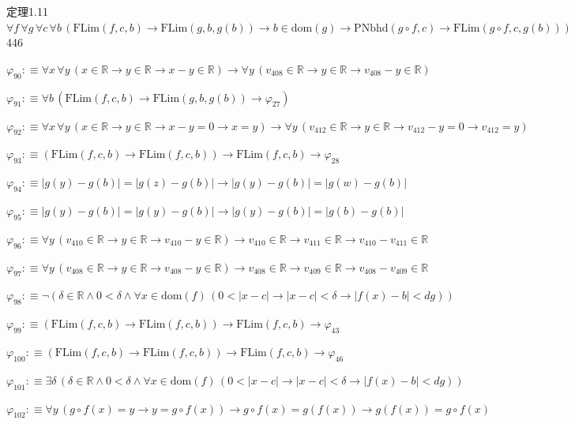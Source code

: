 \begin{fullproof}{定理1.11}{$\forall f\,\forall g\,\forall c\,\forall b\,(\mathrm{FLim}(f,c,b) \to \mathrm{FLim}(g,b,g(b)) \to b \in \mathrm{dom}(g) \to \mathrm{PNbhd}(g \circ f,c) \to \mathrm{FLim}(g \circ f,c,g(b)))$}{446}
\begin{abbrevlist}
\item $\varphi_{90} :\equiv \forall x\,\forall y\,(x \in \mathbb{R} \to y \in \mathbb{R} \to x - y \in \mathbb{R}) \to \forall y\,(v_{408} \in \mathbb{R} \to y \in \mathbb{R} \to v_{408} - y \in \mathbb{R})$
\item $\varphi_{91} :\equiv \forall b\,(\mathrm{FLim}(f,c,b) \to \mathrm{FLim}(g,b,g(b)) \to \varphi_{27})$
\item $\varphi_{92} :\equiv \forall x\,\forall y\,(x \in \mathbb{R} \to y \in \mathbb{R} \to x - y = 0 \to x = y) \to \forall y\,(v_{412} \in \mathbb{R} \to y \in \mathbb{R} \to v_{412} - y = 0 \to v_{412} = y)$
\item $\varphi_{93} :\equiv (\mathrm{FLim}(f,c,b) \to \mathrm{FLim}(f,c,b)) \to \mathrm{FLim}(f,c,b) \to \varphi_{28}$
\item $\varphi_{94} :\equiv \lvert g(y) - g(b) \rvert = \lvert g(z) - g(b) \rvert \to \lvert g(y) - g(b) \rvert = \lvert g(w) - g(b) \rvert$
\item $\varphi_{95} :\equiv \lvert g(y) - g(b) \rvert = \lvert g(y) - g(b) \rvert \to \lvert g(y) - g(b) \rvert = \lvert g(b) - g(b) \rvert$
\item $\varphi_{96} :\equiv \forall y\,(v_{410} \in \mathbb{R} \to y \in \mathbb{R} \to v_{410} - y \in \mathbb{R}) \to v_{410} \in \mathbb{R} \to v_{411} \in \mathbb{R} \to v_{410} - v_{411} \in \mathbb{R}$
\item $\varphi_{97} :\equiv \forall y\,(v_{408} \in \mathbb{R} \to y \in \mathbb{R} \to v_{408} - y \in \mathbb{R}) \to v_{408} \in \mathbb{R} \to v_{409} \in \mathbb{R} \to v_{408} - v_{409} \in \mathbb{R}$
\item $\varphi_{98} :\equiv \neg (\delta \in \mathbb{R} \land 0 < \delta \land \forall x \in \mathrm{dom}(f)\,(0 < \lvert x - c \rvert \to \lvert x - c \rvert < \delta \to \lvert f(x) - b \rvert < \mathit{dg}))$
\item $\varphi_{99} :\equiv (\mathrm{FLim}(f,c,b) \to \mathrm{FLim}(f,c,b)) \to \mathrm{FLim}(f,c,b) \to \varphi_{43}$
\item $\varphi_{100} :\equiv (\mathrm{FLim}(f,c,b) \to \mathrm{FLim}(f,c,b)) \to \mathrm{FLim}(f,c,b) \to \varphi_{46}$
\item $\varphi_{101} :\equiv \exists \delta\,(\delta \in \mathbb{R} \land 0 < \delta \land \forall x \in \mathrm{dom}(f)\,(0 < \lvert x - c \rvert \to \lvert x - c \rvert < \delta \to \lvert f(x) - b \rvert < \mathit{dg}))$
\item $\varphi_{102} :\equiv \forall y\,(g \circ f(x) = y \to y = g \circ f(x)) \to g \circ f(x) = g(f(x)) \to g(f(x)) = g \circ f(x)$

\end{abbrevlist}
\end{fullproof}
